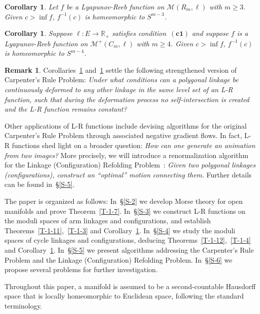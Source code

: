 \documentclass[11pt,letterpaper]{amsart}
\theoremstyle{plain}
\newtheorem{corollary}[theorem]{Corollary}
\theoremstyle{definition}
\newtheorem{remark}[theorem]{Remark}
\theoremstyle{remark}
\numberwithin{equation}{section}
\begin{document}
\begin{corollary}\label{C-1-13}
Let $f$ be a Lyapunov-Reeb function on $\mathcal M(R_m,\ell)$ with $m\geq 3$. Given $c>\inf f$, $f^{-1}(c)$ is homeomorphic to $S^{m-3}$.
\end{corollary}

\begin{corollary}\label{C-1-14}
Suppose $\ell:E\to\mathbb R_{+}$ satisfies condition~$\mathrm{\mathbf{(c1)}}$ and
suppose $f$ is a Lyapunov-Reeb function on $\mathcal M^{+}(C_m,\ell)$ with $m\geq4$. Given $c>\inf f$, $f^{-1}(c)$ is homeomorphic to $S^{m-4}$.
\end{corollary}


\begin{remark}
Corollaries~\ref{C-1-13} and~\ref{C-1-14} settle the following strengthened version of Carpenter's Rule Problem: \emph{Under what conditions can a polygonal linkage be continuously deformed to any other linkage in the same level set of an L-R function, such that during the deformation process no self-intersection is created and the L-R function remains constant?}
\end{remark}

Other applications of L-R functions include devising algorithms for the original Carpenter's Rule Problem through associated negative gradient flows. In fact, L-R functions shed light on a broader question: \emph{How can one generate an animation from two images?} More precisely, we will introduce a renormalization algorithm for the Linkage (Configuration) Refolding Problem~\cite{Cantarella-2004,Demaine-2009}: \emph{Given two polygonal linkages (configurations), construct an ``optimal'' motion connecting them.}
Further details can be found in~\S\ref{S-5}.

The paper is organized as follows: In~\S\ref{S-2} we develop Morse theory for open manifolds and prove Theorem~\ref{T-1-7}. In~\S\ref{S-3} we construct L-R functions on the moduli spaces of arm linkages and configurations, and establish Theorems~\ref{T-1-11},~\ref{T-1-3} and Corollary~\ref{C-1-13}. In~\S\ref{S-4} we study the moduli spaces of cycle linkages and configurations, deducing
Theorems~\ref{T-1-12},~\ref{T-1-4} and Corollary~\ref{C-1-14}. In~\S\ref{S-5} we present algorithms addressing the Carpenter's Rule Problem and the Linkage (Configuration) Refolding Problem. In~\S\ref{S-6} we propose several problems for further investigation.

Throughout this paper, a manifold is assumed to be a second-countable Hausdorff space that is locally homeomorphic to Euclidean space, following the standard terminology.
\end{document}
